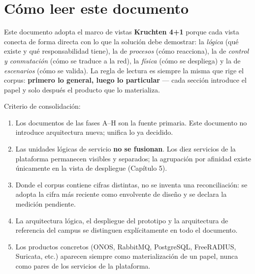 \documentclass[11pt,a4paper]{report}
\begin{document}
\tableofcontents
\newpage

\chapter*{Cómo leer este documento}

Este documento adopta el marco de vistas \textbf{Kruchten 4+1} porque cada vista conecta de forma directa con lo que la solución debe demostrar: la \emph{lógica} (qué existe y qué responsabilidad tiene), la de \emph{procesos} (cómo reacciona), la de \emph{control y conmutación} (cómo se traduce a la red), la \emph{física} (cómo se despliega) y la de \emph{escenarios} (cómo se valida). La regla de lectura es siempre la misma que rige el corpus: \textbf{primero lo general, luego lo particular} — cada sección introduce el papel y solo después el producto que lo materializa.

Criterio de consolidación:

\begin{enumerate}[label=\arabic*.]
\item Los documentos de las fases A--H son la fuente primaria. Este documento no introduce arquitectura nueva; unifica lo ya decidido.
\item Las unidades lógicas de servicio \textbf{no se fusionan}. Los diez servicios de la plataforma permanecen visibles y separados; la agrupación por afinidad existe únicamente en la vista de despliegue (Capítulo 5).
\item Donde el corpus contiene cifras distintas, no se inventa una reconciliación: se adopta la cifra más reciente como envolvente de diseño y se declara la medición pendiente.
\item La arquitectura lógica, el despliegue del prototipo y la arquitectura de referencia del campus se distinguen explícitamente en todo el documento.
\item Los productos concretos (ONOS, RabbitMQ, PostgreSQL, FreeRADIUS, Suricata, etc.) aparecen siempre como materialización de un papel, nunca como pares de los servicios de la plataforma.
\end{enumerate}

\end{document}
